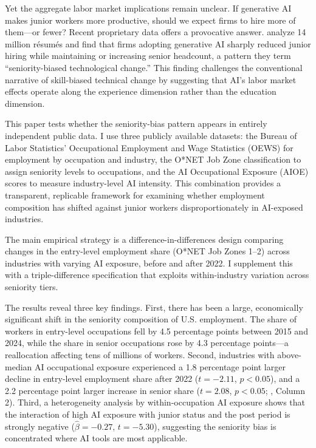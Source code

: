 \documentclass[12pt]{article}
\begin{document}
Yet the aggregate labor market implications remain unclear. If generative AI makes junior workers more productive, should we expect firms to hire more of them---or fewer? Recent proprietary data offers a provocative answer. \citet{hosseini2025} analyze 14 million r\'{e}sum\'{e}s and find that firms adopting generative AI sharply reduced junior hiring while maintaining or increasing senior headcount, a pattern they term ``seniority-biased technological change.'' This finding challenges the conventional narrative of skill-biased technical change \citep{katz1992, goldin2007} by suggesting that AI's labor market effects operate along the experience dimension rather than the education dimension.

This paper tests whether the seniority-bias pattern appears in entirely independent public data. I use three publicly available datasets: the Bureau of Labor Statistics' Occupational Employment and Wage Statistics (OEWS) for employment by occupation and industry, the O*NET Job Zone classification to assign seniority levels to occupations, and the \citet{felten2021} AI Occupational Exposure (AIOE) scores to measure industry-level AI intensity. This combination provides a transparent, replicable framework for examining whether employment composition has shifted against junior workers disproportionately in AI-exposed industries.

The main empirical strategy is a difference-in-differences design comparing changes in the entry-level employment share (O*NET Job Zones 1--2) across industries with varying AI exposure, before and after 2022. I supplement this with a triple-difference specification that exploits within-industry variation across seniority tiers.

The results reveal three key findings. First, there has been a large, economically significant shift in the seniority composition of U.S. employment. The share of workers in entry-level occupations fell by 4.5 percentage points between 2015 and 2024, while the share in senior occupations rose by 4.3 percentage points---a reallocation affecting tens of millions of workers. Second, industries with above-median AI occupational exposure experienced a 1.8 percentage point larger decline in entry-level employment share after 2022 ($t = -2.11$, $p < 0.05$), and a 2.2 percentage point larger increase in senior share ($t = 2.08$, $p < 0.05$; , Column 2). Third, a heterogeneity analysis by within-occupation AI exposure shows that the interaction of high AI exposure with junior status and the post period is strongly negative ($\hat{\beta} = -0.27$, $t = -5.30$), suggesting the seniority bias is concentrated where AI tools are most applicable.
\end{document}
